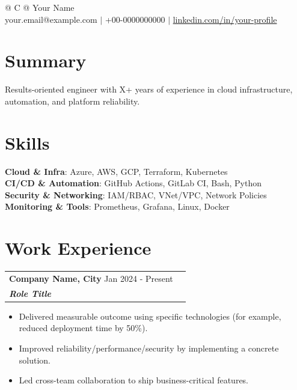 \documentclass[a4paper,10pt]{article}
\begin{document}
\pagestyle{empty}

\begin{tabularx}{\linewidth}{@{} C @{}}
\color[HTML]{1C033C} \Huge{Your Name}\\[6pt]
\textcolor[HTML]{371e77}{{\faEnvelope} your.email@example.com $|$}
\textcolor[HTML]{371e77}{{\faMobile} +00-0000000000} $|$
\textcolor[HTML]{371e77}{\underline{{\raisebox{-0.05\height}{\faLinkedin} linkedin.com/in/your-profile}}}
\end{tabularx}

\section{Summary}
Results-oriented engineer with X+ years of experience in cloud infrastructure, automation, and platform reliability.

\section{Skills}
\begin{itemize}[leftmargin=0.15in, label={}]
  \small{\item{
    \textbf{Cloud \& Infra}{: Azure, AWS, GCP, Terraform, Kubernetes} \\
    \textbf{CI/CD \& Automation}{: GitHub Actions, GitLab CI, Bash, Python} \\
    \textbf{Security \& Networking}{: IAM/RBAC, VNet/VPC, Network Policies} \\
    \textbf{Monitoring \& Tools}{: Prometheus, Grafana, Linux, Docker}
  }}
\end{itemize}

\section{Work Experience}

\begin{tabularx}{\linewidth}{ @{}l r@{} }
\color[HTML]{1C033C} \textbf{Company Name, City} \hfill \color[HTML]{371e77} Jan 2024 - Present \\
\color[HTML]{371e77}\textbf{\textit{Role Title}} \hfill \color[HTML]{371e77}\\[3pt]
\end{tabularx}
\begin{itemize}[nosep, leftmargin=2em, itemsep=2pt]
  \item Delivered measurable outcome using specific technologies (for example, reduced deployment time by 50\%).
  \item Improved reliability/performance/security by implementing a concrete solution.
  \item Led cross-team collaboration to ship business-critical features.
\end{itemize}
\end{document}
